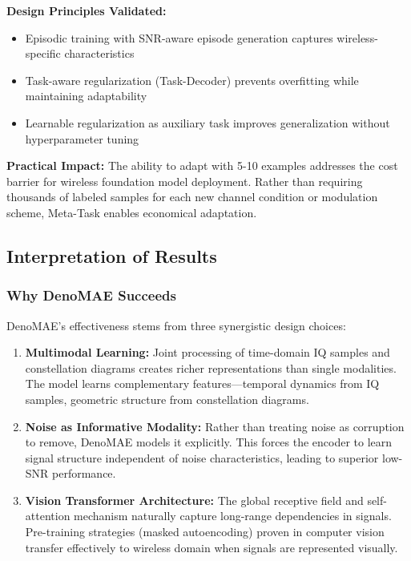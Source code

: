 \textbf{Design Principles Validated:}
\begin{itemize}
    \item Episodic training with SNR-aware episode generation captures wireless-specific characteristics
    \item Task-aware regularization (Task-Decoder) prevents overfitting while maintaining adaptability
    \item Learnable regularization as auxiliary task improves generalization without hyperparameter tuning
\end{itemize}

\textbf{Practical Impact:} The ability to adapt with 5-10 examples addresses the cost barrier for wireless foundation model deployment. Rather than requiring thousands of labeled samples for each new channel condition or modulation scheme, Meta-Task enables economical adaptation.

\subsection{Interpretation of Results}

\subsubsection{Why DenoMAE Succeeds}

DenoMAE's effectiveness stems from three synergistic design choices:

\begin{enumerate}
    \item \textbf{Multimodal Learning:} Joint processing of time-domain IQ samples and constellation diagrams creates richer representations than single modalities. The model learns complementary features—temporal dynamics from IQ samples, geometric structure from constellation diagrams.
    
    \item \textbf{Noise as Informative Modality:} Rather than treating noise as corruption to remove, DenoMAE models it explicitly. This forces the encoder to learn signal structure independent of noise characteristics, leading to superior low-SNR performance.
    
    \item \textbf{Vision Transformer Architecture:} The global receptive field and self-attention mechanism naturally capture long-range dependencies in signals. Pre-training strategies (masked autoencoding) proven in computer vision transfer effectively to wireless domain when signals are represented visually.
\end{enumerate}

